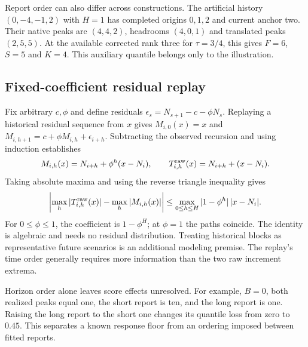 Report order can also differ across constructions. The artificial history $(0,-4,-1,2)$ with $H=1$ has completed origins $0,1,2$ and current anchor two. Their native peaks are $(4,4,2)$, headrooms $(4,0,1)$ and translated peaks $(2,5,5)$. At the available corrected rank three for $\tau=3/4$, this gives $F=6$, $S=5$ and $K=4$. This auxiliary quantile belongs only to the illustration.

\subsection{Fixed-coefficient residual replay}\label{app:replay}
Fix arbitrary $c,\phi$ and define residuals $\epsilon_s=N_{s+1}-c-\phi N_s$. Replaying a historical residual sequence from $x$ gives $M_{i,0}(x)=x$ and $M_{i,h+1}=c+\phi M_{i,h}+\epsilon_{i+h}$. Subtracting the observed recursion and using induction establishes
\begin{equation}
M_{i,h}(x)=N_{i+h}+\phi^h(x-N_i),\qquad
T^{\rm raw}_{i,h}(x)=N_{i+h}+(x-N_i).
\end{equation}
Taking absolute maxima and using the reverse triangle inequality gives
\begin{equation}
\left|\max_h|T^{\rm raw}_{i,h}(x)|-\max_h|M_{i,h}(x)|\right|
\le \max_{0\le h\le H}|1-\phi^h|\,|x-N_i|.
\end{equation}
For $0\le\phi\le1$, the coefficient is $1-\phi^H$; at $\phi=1$ the paths coincide. The identity is algebraic and needs no residual distribution. Treating historical blocks as representative future scenarios is an additional modeling premise. The replay's time order generally requires more information than the two raw increment extrema.

Horizon order alone leaves score effects unresolved. For example, $B=0$, both realized peaks equal one, the short report is ten, and the long report is one. Raising the long report to the short one changes its quantile loss from zero to $0.45$. This separates a known response floor from an ordering imposed between fitted reports.

